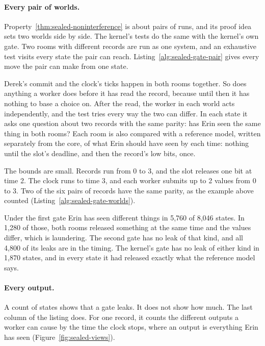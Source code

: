 \paragraph{Every pair of worlds.}
Property~\ref{thm:sealed-noninterference} is about pairs of runs, and its
proof idea sets two worlds side by side. The kernel's tests do the same
with the kernel's own gate. Two rooms with different records are run as
one system, and an exhaustive test visits every state the pair can reach.
Listing~\ref{alg:sealed-gate-pair} gives every move the pair can make
from one state.


Derek's commit and the clock's ticks happen in both rooms together. So
does anything a worker does before it has read the record, because until
then it has nothing to base a choice on. After the read, the worker in
each world acts independently, and the test tries every way the two can
differ. In each state it asks one question about two records with the
same parity: has Erin seen the same thing in both rooms? Each room is also
compared with a reference model, written separately from the core, of
what Erin should have seen by each time: nothing until the slot's
deadline, and then the record's low bits, once.

The bounds are small. Records run from 0 to 3, and the slot releases one
bit at time 2. The clock runs to time 3, and each worker submits up to 2
values from 0 to 3. Two of the six pairs of records have the same parity,
as the example above counted (Listing~\ref{alg:sealed-gate-worlds}).

Under the first gate Erin has seen different things in 5,760 of 8,046
states. In 1,280 of those, both rooms released something at the same time
and the values differ, which is laundering. The second gate has no leak of
that kind, and all 4,800 of its leaks are in the timing. The kernel's gate
has no leak of either kind in 1,870 states, and in every state it had
released exactly what the reference model says.


\paragraph{Every output.}
A count of states shows that a gate leaks. It does not show how much. The
last column of the listing does. For one record, it counts the different
outputs a worker can cause by the time the clock stops, where an output
is everything Erin has seen (Figure~\ref{fig:sealed-views}).


